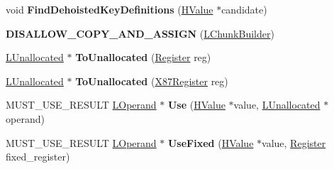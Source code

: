\begin{DoxyCompactItemize}
\item 
void {\bfseries Find\+Dehoisted\+Key\+Definitions} (\hyperlink{classv8_1_1internal_1_1_h_value}{H\+Value} $\ast$candidate)\hypertarget{classv8_1_1internal_1_1_l_chunk_builder_a48d88ec358300afaa035440f6308a96f}{}\label{classv8_1_1internal_1_1_l_chunk_builder_a48d88ec358300afaa035440f6308a96f}

\item 
{\bfseries D\+I\+S\+A\+L\+L\+O\+W\+\_\+\+C\+O\+P\+Y\+\_\+\+A\+N\+D\+\_\+\+A\+S\+S\+I\+GN} (\hyperlink{classv8_1_1internal_1_1_l_chunk_builder}{L\+Chunk\+Builder})\hypertarget{classv8_1_1internal_1_1_l_chunk_builder_a19b07322023329077a9f8c29451592b5}{}\label{classv8_1_1internal_1_1_l_chunk_builder_a19b07322023329077a9f8c29451592b5}

\item 
\hyperlink{classv8_1_1internal_1_1_l_unallocated}{L\+Unallocated} $\ast$ {\bfseries To\+Unallocated} (\hyperlink{structv8_1_1internal_1_1_register}{Register} reg)\hypertarget{classv8_1_1internal_1_1_l_chunk_builder_ae996944c8e59f0e19fe2743090135cb9}{}\label{classv8_1_1internal_1_1_l_chunk_builder_ae996944c8e59f0e19fe2743090135cb9}

\item 
\hyperlink{classv8_1_1internal_1_1_l_unallocated}{L\+Unallocated} $\ast$ {\bfseries To\+Unallocated} (\hyperlink{structv8_1_1internal_1_1_double_register}{X87\+Register} reg)\hypertarget{classv8_1_1internal_1_1_l_chunk_builder_add21d1c4024ea09985fc10cbd7f08f6e}{}\label{classv8_1_1internal_1_1_l_chunk_builder_add21d1c4024ea09985fc10cbd7f08f6e}

\item 
M\+U\+S\+T\+\_\+\+U\+S\+E\+\_\+\+R\+E\+S\+U\+LT \hyperlink{classv8_1_1internal_1_1_l_operand}{L\+Operand} $\ast$ {\bfseries Use} (\hyperlink{classv8_1_1internal_1_1_h_value}{H\+Value} $\ast$value, \hyperlink{classv8_1_1internal_1_1_l_unallocated}{L\+Unallocated} $\ast$operand)\hypertarget{classv8_1_1internal_1_1_l_chunk_builder_accd60b3b89817c5ad33a2124e268e793}{}\label{classv8_1_1internal_1_1_l_chunk_builder_accd60b3b89817c5ad33a2124e268e793}

\item 
M\+U\+S\+T\+\_\+\+U\+S\+E\+\_\+\+R\+E\+S\+U\+LT \hyperlink{classv8_1_1internal_1_1_l_operand}{L\+Operand} $\ast$ {\bfseries Use\+Fixed} (\hyperlink{classv8_1_1internal_1_1_h_value}{H\+Value} $\ast$value, \hyperlink{structv8_1_1internal_1_1_register}{Register} fixed\+\_\+register)\hypertarget{classv8_1_1internal_1_1_l_chunk_builder_a61be80f9ab32bd10c228aad8844f63b7}{}\label{classv8_1_1internal_1_1_l_chunk_builder_a61be80f9ab32bd10c228aad8844f63b7}


\end{DoxyCompactItemize}
